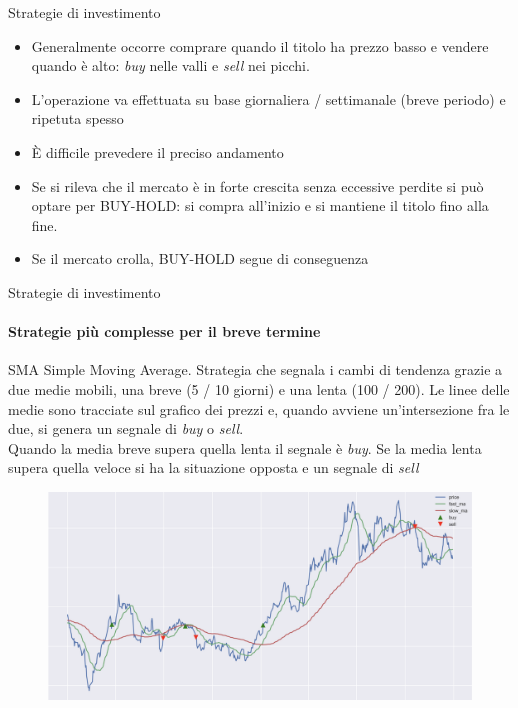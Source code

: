 \documentclass{beamer}
\begin{document}
\begin{frame}{Strategie di investimento}
\begin{itemize}
    \item Generalmente occorre comprare quando il titolo ha prezzo basso e vendere quando è alto: \textit{buy} nelle valli e \textit{sell} nei picchi. 
    \item L'operazione va effettuata su base giornaliera / settimanale (breve periodo) e ripetuta spesso
    \item È difficile prevedere il preciso andamento
    \item Se si rileva che il mercato è in forte crescita senza eccessive perdite si può optare per BUY-HOLD: si compra all'inizio e si mantiene il titolo fino alla fine.
    \item Se il mercato crolla, BUY-HOLD segue di conseguenza
\end{itemize}
\end{frame}

\begin{frame}{Strategie di investimento}
\framesubtitle{Strategie più complesse per il breve termine}
\begin{itemize}
    \begin{block}{SMA}
    Simple Moving Average. Strategia che segnala i cambi di tendenza grazie a due medie mobili, una breve (5 / 10 giorni) e una lenta (100 / 200). Le linee delle medie sono tracciate sul grafico dei prezzi e, quando avviene un'intersezione fra le due, si genera un segnale di \textit{buy} o \textit{sell}.\\ Quando la media breve supera quella lenta il segnale è \textit{buy}. Se la media lenta supera quella veloce si ha la situazione opposta e un segnale di \textit{sell}
    \end{block}
    \begin{figure}
        \centering
        \includegraphics[width=.5\linewidth]{moving_avg2}
    \end{figure}
\end{itemize}
\end{frame}
\end{document}
